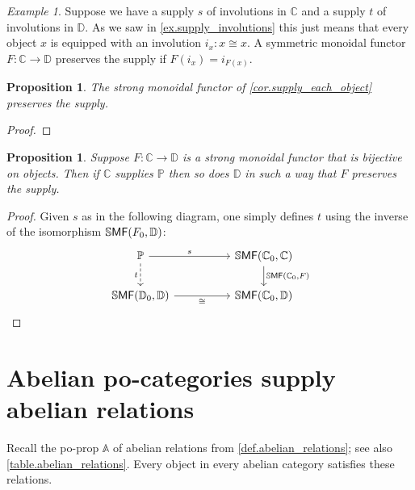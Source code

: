 \documentclass[11pt, oneside, article]{memoir}
\theoremstyle{plain}
\newtheorem{proposition}[theorem]{Proposition}
\theoremstyle{definition}
\theoremstyle{remark}
\newtheorem{example}[theorem]{Example}
\newcommand{\ccat}[1]{\mathbb{#1}}%
\newcommand{\Cat}[1]{{\mathsf{#1}}}%
\newcommand{\CCat}[1]{\mathbb{\StrLeft{#1}{1}}\Cat{\StrGobbleLeft{#1}{1}}}%
\newcommand{\ssmf}{\CCat{SMF}}
\renewcommand{\aa}{\mathbb{A}} %
\newcommand{\cc}{\mathbb{C}}
\newcommand{\dd}{\mathbb{D}}
\newcommand{\pp}{\mathbb{P}}
\newcommand{\mob}[1]{#1_0}
\begin{document}
\begin{example}\label{ex.preserve_involutions}
Suppose we have a supply $s$ of involutions in $\cc$ and a supply $t$ of involutions in $\dd$. As we saw in \cref{ex.supply_involutions} this just means that every object $x$ is equipped with an involution $i_x\colon x\cong x$. A symmetric monoidal functor $F\colon\cc\to\dd$ preserves the supply if $F(i_x)=i_{F(x)}$.
\end{example}

\begin{proposition}
  The strong monoidal functor of \cref{cor.supply_each_object} preserves the supply.
\end{proposition}
\begin{proof}
\end{proof} 

\begin{proposition}\label{prop.strong_bo}
Suppose $F\colon\cc\to\dd$ is a strong monoidal functor that is bijective on objects. Then if $\cc$ supplies $\ccat{P}$ then so does $\dd$ in such a way that $F$ preserves the supply.
\end{proposition}
\begin{proof}
Given $s$ as in the following diagram, one simply defines $t$ using the inverse of the isomorphism $\ssmf(\mob{F},\dd)$:
\[
\begin{tikzcd}[column sep=50pt]
	\pp\ar[r, "s"]\ar[d, dashed, "t"']&
	\ssmf(\mob{\cc},\cc)\ar[d, "{\ssmf(\mob{\cc},F)}"]\\
	\ssmf(\mob{\dd},\dd)\ar[r, "\cong"']&
	\ssmf(\mob{\cc},\dd)
\end{tikzcd}
\qedhere
\]
\end{proof}

\section{Abelian po-categories supply abelian relations}

Recall the po-prop $\aa$ of abelian relations from \cref{def.abelian_relations}; see also \cref{table.abelian_relations}. Every object in every abelian category satisfies these relations.
\end{document}
